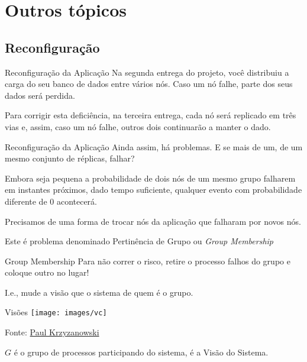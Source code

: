 \section{Outros tópicos}





\subsection{Reconfiguração}

\begin{frame}{Reconfiguração da Aplicação}
Na segunda entrega do projeto, você distribuiu a carga do seu banco de dados entre vários nós. Caso um nó falhe, parte dos seus dados será perdida.

Para corrigir esta deficiência, na terceira entrega, cada nó será replicado em três vias e, assim, caso um nó falhe, outros dois continuarão a manter o dado.

\end{frame}

\begin{frame}{Reconfiguração da Aplicação}
Ainda assim, há problemas. E se mais de um, de um mesmo conjunto de réplicas, falhar? 

\pause Embora seja pequena a probabilidade de dois nós de um mesmo grupo falharem em instantes próximos, dado tempo suficiente, qualquer evento com probabilidade diferente de 0 acontecerá.

\pause Precisamos de uma forma de trocar nós da aplicação que falharam por novos nós. 

Este é problema denominado Pertinência de Grupo ou \emph{Group Membership}
\end{frame}


\begin{frame}{Group Membership}
Para não correr o risco, retire o processo falhos do grupo e coloque outro no lugar!

I.e., mude a visão que o sistema de quem é o grupo.
\end{frame}



\begin{frame}{Visões}
\texttt{[image: images/vc]}

Fonte: \href{https://www.cs.rutgers.edu/~pxk/417/notes/virtual_synchrony.html}{Paul Krzyzanowski}

$G$ é o grupo de processos participando do sistema, é a Visão do Sistema.
\end{frame}

